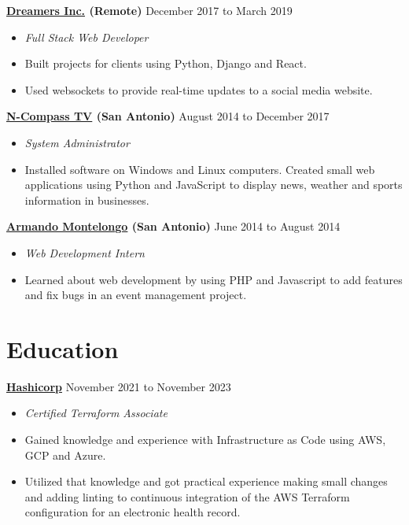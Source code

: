 \documentclass[10pt]{article}
\begin{document}
  \textbf{\href{https://thedreamers.us/}{Dreamers Inc.} (Remote)} \hfill {December 2017 to March 2019}
    \begin{itemize}
     \item[] \textit{Full Stack Web Developer}
     \item[] Built projects for clients using Python, Django and React.
     \item[] Used websockets to provide real-time updates to a social media website.
    \end{itemize}

   \textbf{\href{https://n-compass.tv/}{N-Compass TV} (San Antonio)} \hfill {August 2014 to December 2017}
    \begin{itemize}
        \item[] \textit{System Administrator}
        \item[] Installed software on Windows and Linux computers.
         Created small web applications using Python and JavaScript to display news, weather and sports information in businesses.
    \end{itemize}

   \textbf{\href{https://armandomontelongo.com/}{Armando Montelongo} (San Antonio)} \hfill {June 2014 to August 2014}
    \begin{itemize}
     \item[] \textit{Web Development Intern}
     \item[] Learned about web development by using PHP and Javascript to add features and fix bugs in an event management project.
    \end{itemize}

   \section*{Education}
   \noindent

  \textbf{\href{https://www.credly.com/badges/d4012af6-1c9f-4ca8-aa2a-931c2c3c8e5b}{Hashicorp}} \hfill {November 2021 to November 2023}
   \begin{itemize}
     \item[] \textit{Certified Terraform Associate}
     \item[] Gained knowledge and experience with Infrastructure as Code using AWS, GCP and Azure.
     \item[] Utilized that knowledge and got practical experience making small changes and adding linting to continuous integration of the AWS Terraform configuration for an electronic health record.
    \end{itemize}
\end{document}
